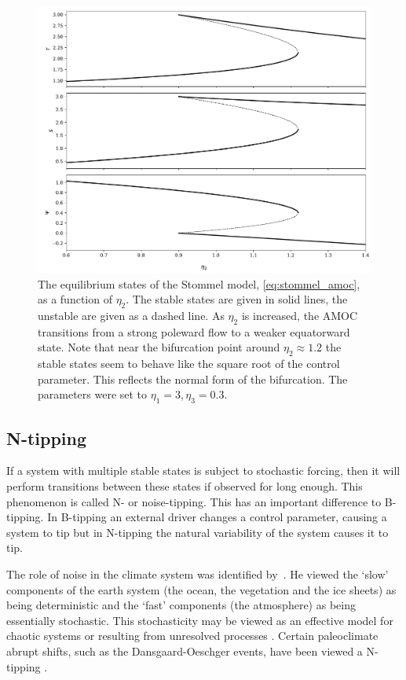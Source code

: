 \begin{figure}
  \centering
  \includegraphics[width=\textwidth,keepaspectratio]{stommel}
  \caption[The Stommel Model of the AMOC]{The equilibrium states of the Stommel model, \cref{eq:stommel_amoc}, as a function of $\eta_2$. The stable states are given in solid lines,
    the unstable are given as a dashed line. As $\eta_2$ is increased, the AMOC transitions from a strong poleward flow to a weaker equatorward state. Note that near the
    bifurcation point around $\eta_2 \approx 1.2$ the stable states seem to behave like the square root of the control parameter. This reflects the normal form of
    the bifurcation. The parameters were set to $\eta_1 = 3,\eta_3=0.3$.}
  \label{fig:stommel_amoc}
\end{figure}
\subsection{N-tipping}
If a system with multiple stable states is subject to stochastic forcing, then it will perform transitions between these states if observed for long enough. This
phenomenon is called N- or noise-tipping. This has an important difference to B-tipping. In B-tipping an external driver changes a control parameter, causing a system to tip
but in N-tipping the natural variability of the system causes it to tip.

The role of noise in the climate system was identified by~\cite{Hasselmann1976}. He viewed the `slow' components of the earth system (the ocean, the vegetation and the ice sheets) as being
deterministic and the `fast' components (the atmosphere) as being essentially stochastic. This stochasticity may be viewed as an effective model for chaotic systems \parencite{Lorenz1963}
or resulting from unresolved processes \parencite{Palmer2009}. Certain paleoclimate abrupt shifts, such as the Dansgaard-Oeschger events, have been viewed a N-tipping \parencite{Ditlevsen1999}.

